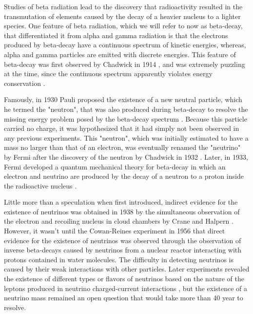 Studies of beta radiation lead to the discovery that radioactivity resulted in the transmutation of elements \cite{rutherford_transmutation} caused by the decay of a heavier nucleus to a lighter species. One feature of beta radiation, which we will refer to now as beta-decay, that differentiated it from alpha and gamma radiation is that the electrons produced by beta-decay have a continuous spectrum of kinetic energies, whereas, alpha and gamma particles are emitted with discrete energies. This feature of beta-decay was first observed by Chadwick in 1914 \cite{chadwick1914}, and was extremely puzzling at the time, since the continuous spectrum apparently violates energy conservation \cite{bohr_energy_nonconservation_ref}. 

Famously, in 1930 Pauli proposed the existence of a new neutral particle, which he termed the "neutron", that was also produced during beta-decay to resolve the missing energy problem posed by the beta-decay spectrum \cite{Pauli:1930pc}. Because this particle carried no charge, it was hypothesized that it had simply not been observed in any previous experiments. This "neutron", which was initially estimated to have a mass no larger than that of an electron, was eventually renamed the "neutrino" by Fermi \cite{fermi_rename} after the discovery of the neutron by Chadwick in 1932 \cite{neutron}. Later, in 1933, Fermi developed a quantum mechanical theory for beta-decay in which an electron and neutrino are produced by the decay of a neutron to a proton inside the radioactive nucleus \cite{fermi_beta_decay}.

Little more than a speculation when first introduced, indirect evidence for the existence of neutrinos was obtained in 1938 by the simultaneous observation of the electron and recoiling nucleus in cloud chambers by Crane and Halpern \cite{crane_halpern}. However, it wasn't until the Cowan-Reines experiment \cite{cowan_reines} in 1956 that direct evidence for the existence of neutrinos was observed through the observation of inverse beta-decays caused by neutrinos from a nuclear reactor interacting with protons contained in water molecules. The difficulty in detecting neutrinos is caused by their weak interactions with other particles. Later experiments revealed the existence of different types or flavors of neutrinos based on the nature of the leptons produced in neutrino charged-current interactions \cite{neutrino_flavor}, but the existence of a neutrino mass remained an open question that would take more than 40 year to resolve.

